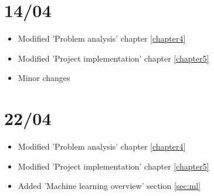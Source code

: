 \section{14/04}
\begin{itemize}
    \item Modified 'Problem analysis' chapter \ref{chapter4}
    \item Modified 'Project implementation' chapter \ref{chapter5}
    \item Minor changes
\end{itemize}

\section{22/04}
\begin{itemize}
    \item Modified 'Problem analysis' chapter \ref{chapter4}
    \item Modified 'Project implementation' chapter \ref{chapter5}
    \item Added 'Machine learning overview' section \ref{sec:ml}
\end{itemize}